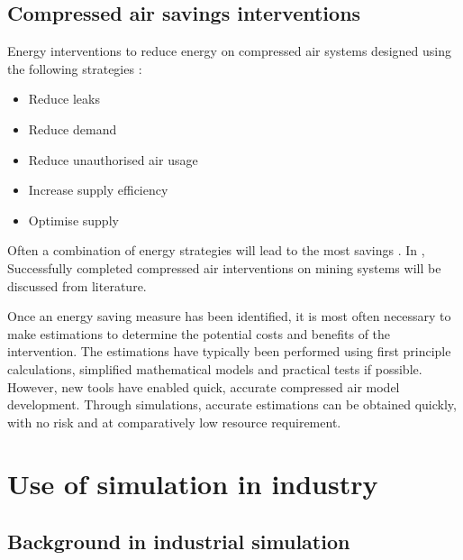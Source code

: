 	\subsection{Compressed air savings interventions}
		Energy interventions to reduce energy on compressed air systems designed using the following strategies \cite{Snyman2011Masters}:
		\begin{itemize}
			\item Reduce leaks
			\item Reduce demand
			\item Reduce unauthorised air usage
			\item Increase supply efficiency
			\item Optimise supply
		\end{itemize}
	 Often a combination of energy strategies will lead to the most savings \cite{Marais2012PhD}. In , Successfully completed compressed air interventions on mining systems will be discussed from literature.
	 \par 
	 Once an energy saving measure has been identified, it is most often necessary to make estimations to determine the potential costs and benefits of the intervention. The estimations have typically been performed using first principle calculations, simplified mathematical models and practical tests if possible. However, new tools have enabled quick, accurate compressed air model development. Through simulations, accurate estimations can be obtained quickly, with no risk and at comparatively low resource requirement.
\section{Use of simulation in industry }
	\subsection{Background in industrial simulation}
	
